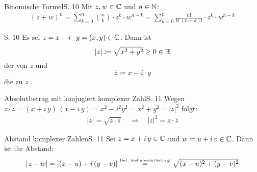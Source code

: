 \begin{bemerkung}{Binomische Formel}{S. 10}
  Mit $z, w \in \mathbb{C}$ und $n \in \mathbb{N}$:
  \begin{align}
    (z + w)^n
      = \sum_{k=0}^n \binom{n}{k} \cdot z^k \cdot w^{n-k}
      = \sum_{k=0}^n \frac{n!}{k! \, (n-k)!} \cdot z^k \cdot w^{n-k}
  \end{align}
\end{bemerkung}

\begin{definition}{S. 10}
  \label{def:absolutbetrag}
  Es sei $z = x + i \cdot y = (x, y) \in \mathbb{C}$.
  Dann ist
  \[ |z| \coloneqq \sqrt{x^2 + y^2} \geq 0 \in \mathbb{R} \]
  der  von $z$ und
  \[ \overline{z} \coloneqq x - i \cdot y \]
  die zu $z$ .
\end{definition}

\begin{bemerkung}{Absolutbetrag mit konjugiert komplexer Zahl}{S. 11}
  Wegen $z \cdot \overline{z} = (x + i \, y) \, (x - i \, y) = x^2 - i^2 y^2 = x^2 + y^2 = |z|^2$ folgt:
  \begin{align}
    |z| = \sqrt{z \cdot \overline{z}}
    \quad\Rightarrow\quad
    |z|^2 = z \cdot \overline{z}
  \end{align}
\end{bemerkung}

\begin{bemerkung}{Abstand komplexer Zahlen}{S. 11}
  Sei $z = x + i \, y \in \mathbb{C}$ und $w = u + i \, v \in \mathbb{C}$.
  Dann ist ihr Abstand:
  \begin{align}
    | z - w |
      = | (x-u) + i \, (y-v) |
      \stackrel{\text{\tiny{Def. \ref{def:absolutbetrag}}}}{=} \sqrt{(x-u)^2 + (y-v)^2 }
  \end{align}
\end{bemerkung}

